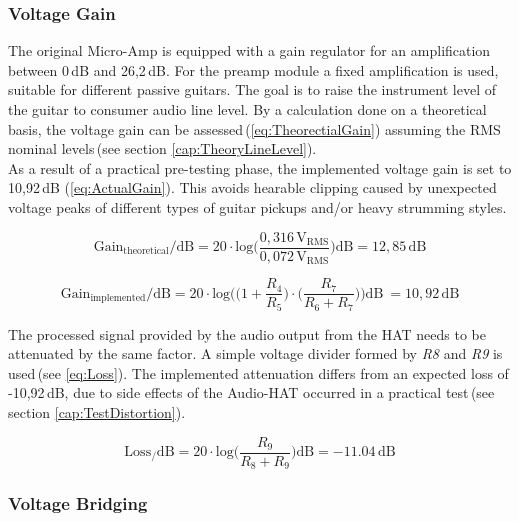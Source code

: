 \subsubsection{Voltage Gain}
The original Micro-Amp is equipped with a gain regulator for an amplification between 0\,dB and 26,2\,dB. For the preamp module a fixed amplification is used, suitable for different passive guitars.
The goal is to raise the instrument level of the guitar to consumer audio line level.  
By a calculation done on a theoretical basis, the voltage gain can be assessed\,(\ref{eq:TheorectialGain}) assuming the RMS nominal levels\,(see section \ref{cap:TheoryLineLevel}).
\\
As a result of a practical pre-testing phase, the implemented voltage gain is set to 10,92\,dB (\ref{eq:ActualGain}). This avoids hearable clipping caused by unexpected voltage peaks of different types of guitar pickups and/or heavy strumming styles.

\begin{equation}
\mathrm{Gain}_{\mathrm{theoretical}}/\mathrm{dB} = 20 \cdot \mathrm{log} \bigg( \frac{0,316\,\mathrm{V}_{\mathrm{RMS}}}{0,072\,\mathrm{V}_{\mathrm{RMS}}} \bigg) \mathrm{dB}  = 12,85\,\mathrm{dB}
\label{eq:TheorectialGain}
\end{equation}

\begin{equation}
\mathrm{Gain}_{\mathrm{implemented}}/\mathrm{dB} = 20 \cdot \mathrm{log} \Bigg( \bigg( 1+ \frac{R_4}{R_5}\bigg) 
\cdot \bigg( \frac{R_7}{R_6+R_7}\bigg) \Bigg) \mathrm{dB}\ = 10,92\,\mathrm{dB}
\label{eq:ActualGain}
\end{equation}

The processed signal provided by the audio output from the HAT needs to be attenuated by the same factor.
A simple voltage divider formed by \textit{R8} and \textit{R9} is used\,(see \ref{eq:Loss}).
The implemented attenuation differs from an expected loss of -10,92\,dB, due to side effects of the Audio-HAT occurred in a practical test\,(see section \ref{cap:TestDistortion}). 

\begin{equation}
\mathrm{Loss}_/\mathrm{dB} = 20 \cdot \mathrm{log}  \bigg(  \frac{R_9}{R_8 + R_9} \bigg)  \mathrm{dB} = -11.04\,\mathrm{dB}
\label{eq:Loss}
\end{equation}

\subsubsection{Voltage Bridging}

